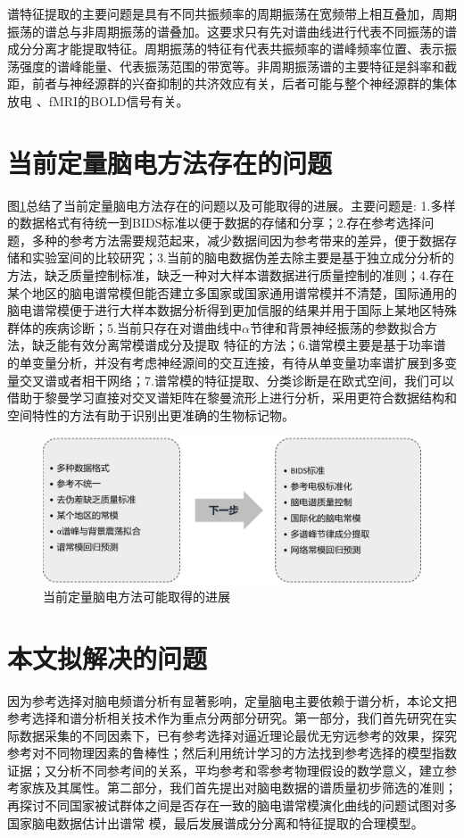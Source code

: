 谱特征提取的主要问题是具有不同共振频率的周期振荡在宽频带上相互叠加，周期振荡的谱总与非周期振荡的谱叠加。这要求只有先对谱曲线进行代表不同振荡的谱成分分离才能提取特征。周期振荡的特征有代表共振频率的谱峰频率位置、表示振荡强度的谱峰能量、代表振荡范围的带宽等。非周期振荡谱的主要特征是斜率和截距，前者与神经源群的兴奋抑制的共济效应有关，后者可能与整个神经源群的集体放电
、fMRI的BOLD信号有关。

\section{当前定量脑电方法存在的问题}
图\ref{qEEGnext}总结了当前定量脑电方法存在的问题以及可能取得的进展。主要问题是: 1.多样的数据格式有待统一到BIDS标准以便于数据的存储和分享；2.存在参考选择问题，多种的参考方法需要规范起来，减少数据间因为参考带来的差异，便于数据存储和实验室间的比较研究；3.当前的脑电数据伪差去除主要是基于独立成分分析的方法，缺乏质量控制标准，缺乏一种对大样本谱数据进行质量控制的准则；4.存在某个地区的脑电谱常模但能否建立多国家或国家通用谱常模并不清楚，国际通用的脑电谱常模便于进行大样本数据分析得到更加信服的结果并用于国际上某地区特殊群体的疾病诊断；5.当前只存在对谱曲线中$\alpha$节律和背景神经振荡的参数拟合方法，缺乏能有效分离常模谱成分及提取
特征的方法；6.谱常模主要是基于功率谱的单变量分析，并没有考虑神经源间的交互连接，有待从单变量功率谱扩展到多变量交叉谱或者相干网络；7.谱常模的特征提取、分类诊断是在欧式空间，我们可以借助于黎曼学习直接对交叉谱矩阵在黎曼流形上进行分析，采用更符合数据结构和空间特性的方法有助于识别出更准确的生物标记物。
\begin{figure}[!h]
	\includegraphics[width=12cm]{pic/xulun/qEEGnext.png}
	\caption{当前定量脑电方法可能取得的进展}
	\label{qEEGnext}
\end{figure}

\section{本文拟解决的问题}
因为参考选择对脑电频谱分析有显著影响，定量脑电主要依赖于谱分析，本论文把参考选择和谱分析相关技术作为重点分两部分研究。第一部分，我们首先研究在实际数据采集的不同因素下，已有参考选择对逼近理论最优无穷远参考的效果，探究参考对不同物理因素的鲁棒性；然后利用统计学习的方法找到参考选择的模型指数证据；又分析不同参考间的关系，平均参考和零参考物理假设的数学意义，建立参考家族及其属性。第二部分，我们首先提出对脑电数据的谱质量初步筛选的准则；再探讨不同国家被试群体之间是否存在一致的脑电谱常模演化曲线的问题试图对多国家脑电数据估计出谱常
模，最后发展谱成分分离和特征提取的合理模型。

